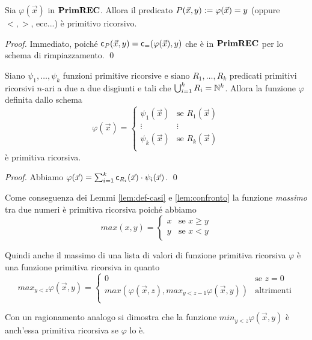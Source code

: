 \documentclass[runningheads,a4paper]{llncs}
\begin{document}
\begin{lemma}
Sia $\varphi(\vec x)$ in $\mathbf{PrimREC}$. Allora il predicato $P(\vec x,y) \mathrel{:=} \varphi(\vec x) = y$ (oppure $<,>$, ecc...) \`{e} primitivo ricorsivo.
\end{lemma}

\begin{proof}
Immediato, poich\'{e} $\mathsf{c}_{P}(\vec x,y) = \mathsf{c}_{=}(\varphi(\vec x),y)$ che \`{e} in $\mathbf{PrimREC}$ per lo schema di rimpiazzamento.
\qed\end{proof}


\begin{lemma}\label{lem:def-casi}
Siano $\psi_1,\ldots,\psi_k$ funzioni primitive ricorsive e siano $R_1,\ldots,R_k$ predicati primitivi ricorsivi $n$-ari a due a due disgiunti e tali che $\bigcup_{i=1}^{k} R_i=\mathbb{N}^k$. Allora la funzione $\varphi$ definita dallo schema
$$
\varphi(\vec x) =
\begin{cases}
\psi_1(\vec x) & \mbox{se } R_1(\vec x) \\
\vdots & \vdots \\
\psi_k(\vec x) & \mbox{se } R_k(\vec x) \\
\end{cases}
$$
\`{e} primitiva ricorsiva.
\end{lemma}

\begin{proof}
Abbiamo $\varphi(\vec x) = \sum_{i=1}^{k} \mathsf{c}_{R_i}(\vec x)\cdot\psi_i(\vec x)$.
\qed\end{proof}

Come conseguenza dei Lemmi \ref{lem:def-casi} e \ref{lem:confronto} la funzione \emph{massimo} tra due numeri \`{e} primitiva ricorsiva poich\'{e} abbiamo 
$$
max(x,y) =
\begin{cases}
x & \mbox{se } x \geq y \\
y & \mbox{se } x < y \\
\end{cases}
$$

Quindi anche il massimo di una lista di valori di funzione primitiva ricorsiva $\varphi$ \`{e} una funzione primitiva ricorsiva in quanto
$$
max_{y < z} \varphi(\vec x,y) = 
\begin{cases}
0 & \mbox{se } z = 0 \\
max(\varphi(\vec x,z), max_{y < z-1} \varphi(\vec x,y)) & \mbox{altrimenti} \\
\end{cases}
$$

Con un ragionamento analogo si dimostra che la funzione $min_{y < z} \varphi(\vec x,y)$ \`{e} anch'essa primitiva ricorsiva se $\varphi$ lo \`{e}.
\end{document}

